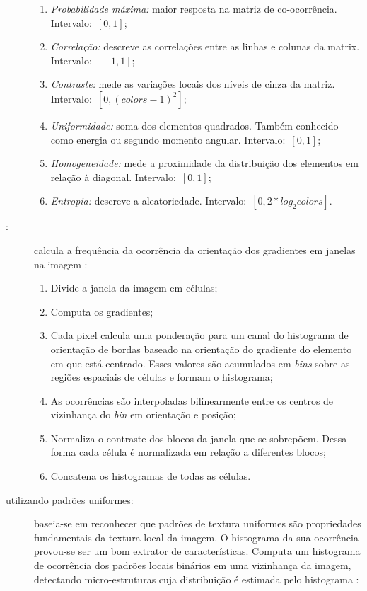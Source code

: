 \begin{description}
\begin{enumerate}
  \item \emph{Probabilidade máxima:} maior resposta na matriz de co-ocorrência. Intervalo:~$[0,1]$;
  \item \emph{Correlação:} descreve as correlações entre as linhas e colunas da matrix.\\ Intervalo:~$[-1,1]$;
  \item \emph{Contraste:} mede as variações locais dos níveis de cinza da matriz.\\ Intervalo:~$[0, (colors-1)^2]$;
  \item \emph{Uniformidade:} soma dos elementos quadrados. Também conhecido como energia ou segundo momento angular. Intervalo:~$[0,1]$;
  \item \emph{Homogeneidade:} mede a proximidade da distribuição dos elementos em relação à diagonal. Intervalo:~$[0,1]$;
  \item \emph{Entropia:} descreve a aleatoriedade. Intervalo:~$[0, 2*log_2 colors]$.
\end{enumerate}

\item [\sigla{HOG}{\textit{Histogram of oriented gradients}}:] calcula a frequência da ocorrência da orientação dos gradientes em janelas na imagem \cite{Dalal2005}:

\begin{enumerate}
  \item Divide a janela da imagem em células;
  \item Computa os gradientes;
  \item Cada pixel calcula uma ponderação para um canal do histograma de orientação de bordas baseado na orientação do gradiente do elemento em que está centrado. Esses valores são acumulados em \textit{bins} sobre as regiões espaciais de células e formam o histograma;
  \item As ocorrências são interpoladas bilinearmente entre os centros de vizinhança do \textit{bin} em orientação e posição;
  \item Normaliza o contraste dos blocos da janela que se sobrepõem. Dessa forma cada célula é normalizada em relação a diferentes blocos;
  \item Concatena os histogramas de todas as células.
\end{enumerate}

\item [\sigla{LBP}{\textit{Local Binary Patterns}} utilizando padrões uniformes:] baseia-se em reconhecer que padrões de textura uniformes são propriedades fundamentais da textura local da imagem. O histograma da sua ocorrência provou-se ser um bom extrator de características. Computa um histograma de ocorrência dos padrões locais binários em uma vizinhança da imagem, detectando micro-estruturas cuja distribuição é estimada pelo histograma \cite{Ojala2002}:


\end{description}
